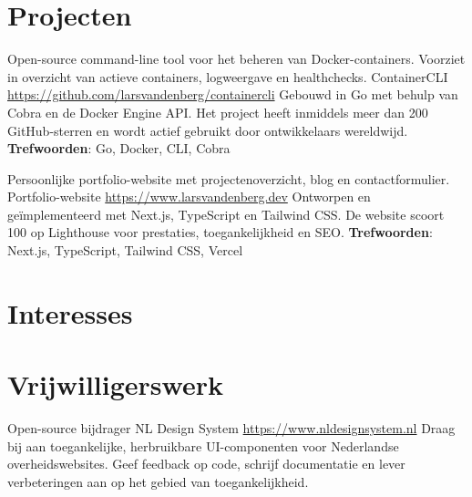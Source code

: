 \documentclass[a4paper, serif, 10pt]{moderncv}
\begin{document}
\section{Projecten}

        {Open-source command-line tool voor het beheren van Docker-containers.
Voorziet in overzicht van actieve containers, logweergave en healthchecks.
}
        {ContainerCLI}
        {\url{https://github.com/larsvandenberg/containercli}}
        {}
        {Gebouwd in Go met behulp van Cobra en de Docker Engine API. Het project
heeft inmiddels meer dan 200 GitHub-sterren en wordt actief gebruikt door
ontwikkelaars wereldwijd.
\textbf{Trefwoorden}: Go, Docker, CLI, Cobra}

        {Persoonlijke portfolio-website met projectenoverzicht, blog en
contactformulier.
}
        {Portfolio-website}
        {\url{https://www.larsvandenberg.dev}}
        {}
        {Ontworpen en geïmplementeerd met Next.js, TypeScript en Tailwind CSS.
De website scoort 100 op Lighthouse voor prestaties, toegankelijkheid en
SEO.
\textbf{Trefwoorden}: Next.js, TypeScript, Tailwind CSS, Vercel}
\section{Interesses}

\section{Vrijwilligerswerk}

        {Open-source bijdrager}
        {NL Design System}
        {\url{https://www.nldesignsystem.nl}}
        {}
        {Draag bij aan toegankelijke, herbruikbare UI-componenten voor Nederlandse
overheidswebsites. Geef feedback op code, schrijf documentatie en lever
verbeteringen aan op het gebied van toegankelijkheid.}
    
\end{document}
